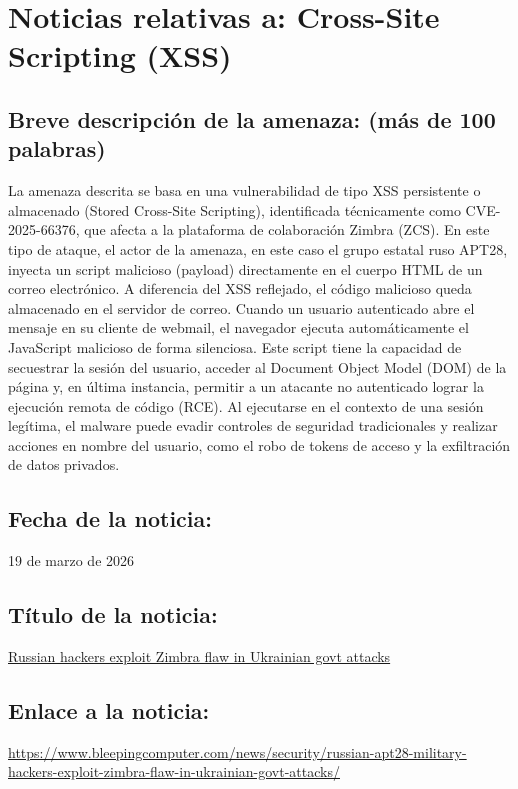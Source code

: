 \chapter{Noticias relativas a: Cross-Site Scripting (XSS)}

    \section{Breve descripción de la amenaza: (más de 100 palabras)}
    La amenaza descrita se basa en una vulnerabilidad de tipo XSS persistente o almacenado (Stored Cross-Site Scripting), identificada técnicamente como CVE-2025-66376, que afecta a la plataforma de colaboración Zimbra (ZCS). En este tipo de ataque, el actor de la amenaza, en este caso el grupo estatal ruso APT28, inyecta un script malicioso (payload) directamente en el cuerpo HTML de un correo electrónico. A diferencia del XSS reflejado, el código malicioso queda almacenado en el servidor de correo. Cuando un usuario autenticado abre el mensaje en su cliente de webmail, el navegador ejecuta automáticamente el JavaScript malicioso de forma silenciosa. Este script tiene la capacidad de secuestrar la sesión del usuario, acceder al Document Object Model (DOM) de la página y, en última instancia, permitir a un atacante no autenticado lograr la ejecución remota de código (RCE). Al ejecutarse en el contexto de una sesión legítima, el malware puede evadir controles de seguridad tradicionales y realizar acciones en nombre del usuario, como el robo de tokens de acceso y la exfiltración de datos privados.

    \section{Fecha de la noticia:}
    19 de marzo de 2026
   
    \section{Título de la noticia:}
    \href{https://www.bleepingcomputer.com/news/security/russian-apt28-military-hackers-exploit-zimbra-flaw-in-ukrainian-govt-attacks/}{Russian hackers exploit Zimbra flaw in Ukrainian govt attacks}

    \section{Enlace a la noticia:}
    \href{https://www.bleepingcomputer.com/news/security/russian-apt28-military-hackers-exploit-zimbra-flaw-in-ukrainian-govt-attacks/}{https://www.bleepingcomputer.com/news/security/russian-apt28-military-hackers-exploit-zimbra-flaw-in-ukrainian-govt-attacks/}


